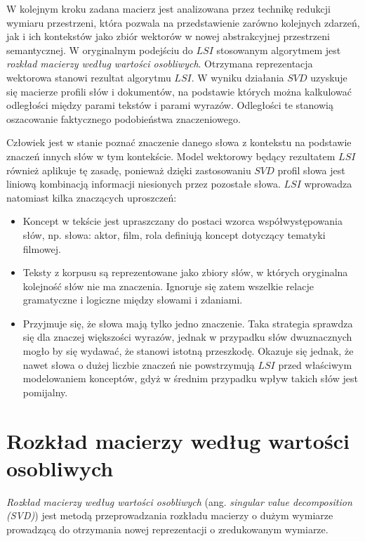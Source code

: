 \documentclass{pracamgr}
\begin{document}
W kolejnym kroku zadana macierz jest analizowana przez technikę redukcji wymiaru przestrzeni, która pozwala na przedstawienie zarówno kolejnych zdarzeń, jak i ich kontekstów jako zbiór wektorów w nowej abstrakcyjnej przestrzeni semantycznej. W oryginalnym podejściu do $LSI$ stosowanym algorytmem jest \textit{rozkład macierzy według wartości osobliwych}. Otrzymana reprezentacja wektorowa stanowi rezultat algorytmu $LSI$. W wyniku działania $SVD$ uzyskuje się macierze profili słów i dokumentów, na podstawie których można kalkulować odległości między parami tekstów i parami wyrazów. Odległości te stanowią oszacowanie faktycznego podobieństwa znaczeniowego.

Człowiek jest w stanie poznać znaczenie danego słowa z kontekstu na podstawie znaczeń innych słów w tym kontekście. Model wektorowy będący rezultatem $LSI$ również aplikuje tę zasadę, ponieważ dzięki zastosowaniu $SVD$ profil słowa jest liniową kombinacją informacji niesionych przez pozostałe słowa. $LSI$ wprowadza natomiast kilka znaczących uproszczeń:

\begin{itemize}
    \item Koncept w tekście jest upraszczany do postaci wzorca współwystępowania słów, np. słowa: aktor, film, rola definiują koncept dotyczący tematyki filmowej.
    \item Teksty z korpusu są reprezentowane jako zbiory słów, w których oryginalna kolejność słów nie ma znaczenia. Ignoruje się zatem wszelkie relacje gramatyczne i logiczne między słowami i zdaniami. 
    \item Przyjmuje się, że słowa mają tylko jedno znaczenie. Taka strategia sprawdza się dla znaczej większości wyrazów, jednak w przypadku słów dwuznacznych mogło by się wydawać, że stanowi istotną przeszkodę. Okazuje się jednak, że nawet słowa o dużej liczbie znaczeń nie powstrzymują $LSI$ przed właściwym modelowaniem konceptów, gdyż w średnim przypadku wpływ takich słów jest pomijalny.
\end{itemize}

\section{Rozkład macierzy według wartości osobliwych}
\textit{Rozkład macierzy według wartości osobliwych} (ang. \textit{singular value decomposition (SVD)}) jest metodą przeprowadzania rozkładu macierzy o dużym wymiarze prowadzącą do otrzymania nowej reprezentacji o zredukowanym wymiarze.
\end{document}
